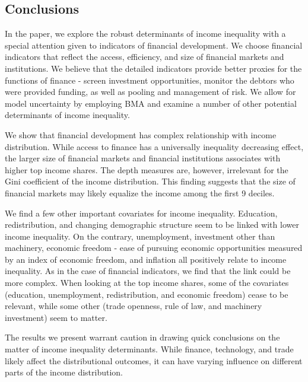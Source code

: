 \begin{refsection}
%
%
%
%
%

\section{Conclusions}
\label{ch4sec:conclusion}
In the paper, we explore the robust determinants of income inequality with a special attention given to indicators of financial development. We choose financial indicators that reflect the access, efficiency, and size of financial markets and institutions. We believe that the detailed indicators provide better proxies for the functions of finance - screen investment opportunities, monitor the debtors who were provided funding, as well as pooling and management of risk. We allow for model uncertainty by employing \ac{BMA} and examine a number of other potential determinants of income inequality. 

We show that financial development has complex relationship with income distribution. While access to finance has a universally inequality decreasing effect, the larger size of financial markets and financial institutions associates with higher top income shares. The depth measures are, however, irrelevant for the Gini coefficient of the income distribution. This finding suggests that the size of financial markets may likely equalize the income among the first 9 deciles. 

We find a few other important covariates for income inequality. Education, redistribution, and changing demographic structure seem to be linked with lower income inequality. On the contrary, unemployment, investment other than machinery, economic freedom - ease of pursuing economic opportunities measured by an index of economic freedom, and inflation all positively relate to income inequality. As in the case of financial indicators, we find that the link could be more complex. When looking at the top income shares, some of the covariates (education, unemployment, redistribution, and economic freedom) cease to be relevant, while some other (trade openness, rule of law, and machinery investment) seem to matter.

The results we present warrant caution in drawing quick conclusions on the matter of income inequality determinants. While finance, technology, and trade likely affect the distributional outcomes, it can have varying influence on different parts of the income distribution.



\end{refsection}
